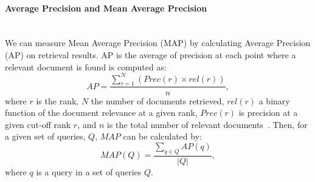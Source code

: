 \paragraph{Average Precision and Mean Average Precision}
\ \\
We can measure Mean Average Precision (MAP) by calculating Average Precision (AP) on retrieval results. AP is the average of precision at each point where a relevant document is found is computed as:
\begin{equation}
AP=\frac{\sum\limits_{r=1}^{N}(Prec(r)\times rel(r))}{n},
\end{equation}
\noindent
where $ r $ is the rank, $ N $ the number of documents retrieved, $ rel(r) $ a binary function of the document relevance at a given rank, $ Prec(r) $ is precision at a given cut-off rank $ r $, and $ n $ is the total number of relevant documents~\citep{manning2008introduction}.
Then, for a given set of queries, $ Q $, $ MAP $ can be calculated by:
\begin{equation}
MAP(Q)=\frac{\sum\limits_{q\in Q}AP(q)}{|Q|},
\end{equation}
\noindent
where $ q $ is a query in a set of queries $ Q $.